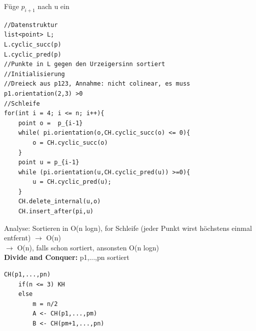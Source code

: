 \documentclass[a4paper]{article}
\begin{document}
\hspace*{1cm}Füge $p_{i+1}$ nach u ein\\
\begin{lstlisting}
//Datenstruktur
list<point> L;
L.cyclic_succ(p)
L.cyclic_pred(p)
//Punkte in L gegen den Urzeigersinn sortiert
//Initialisierung
//Dreieck aus p123, Annahme: nicht colinear, es muss p1.orientation(2,3) >0
//Schleife
for(int i = 4; i <= n; i++){
	point o =  p_{i-1}
	while( pi.orientation(o,CH.cyclic_succ(o) <= 0){
		o = CH.cyclic_succ(o)
	}
	point u = p_{i-1}
	while (pi.orientation(u,CH.cyclic_pred(u)) >=0){
		u = CH.cyclic_pred(u);
	}
	CH.delete_internal(u,o)
	CH.insert_after(pi,u)
\end{lstlisting}
Analyse: Sortieren in O(n logn), for Schleife (jeder Punkt wirst höchstens einmal entfernt) $\rightarrow$ O(n)\\
$\rightarrow$ O(n), falls schon sortiert, ansonsten O(n logn)\\
\textbf{Divide and Conquer:} p1,...,pn sortiert\\
\begin{lstlisting}
CH(p1,...,pn)
	if(n <= 3) KH
	else
		m = n/2
		A <- CH(p1,...,pm)
		B <- CH(pm+1,...,pn)
\end{lstlisting}
\end{document}
